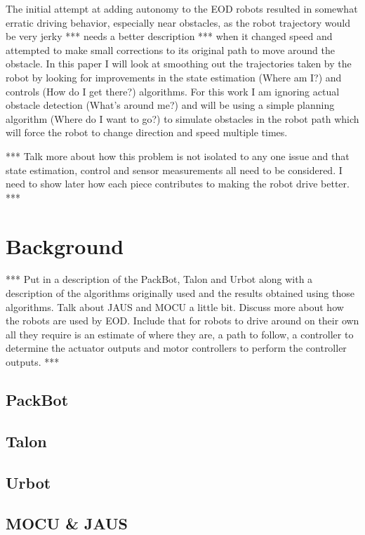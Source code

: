 \documentclass[12pt]{report}
\begin{document}
\begin{spacing}{1.1}
The initial attempt at adding autonomy to the EOD robots resulted in somewhat erratic driving behavior, especially near obstacles, as the robot trajectory would be very jerky *** needs a better description *** when it changed speed and attempted to make small corrections to its original path to move around the obstacle. In this paper I will look at smoothing out the trajectories taken by the robot by looking for improvements in the state estimation (Where am I?) and controls (How do I get there?) algorithms. For this work I am ignoring actual obstacle detection (What's around me?) and will be using a simple planning algorithm (Where do I want to go?) to simulate obstacles in the robot path which will force the robot to change direction and speed multiple times.

*** Talk more about how this problem is not isolated to any one issue and that state estimation, control and sensor measurements all need to be considered. I need to show later how each piece contributes to making the robot drive better. ***
\clearpage

\chapter{Background}
*** Put in a description of the PackBot, Talon and Urbot along with a description of the algorithms originally used and the results obtained using those algorithms. Talk about JAUS and MOCU a little bit. Discuss more about how the robots are used by EOD. Include that for robots to drive around on their own all they require is an estimate of where they are, a path to follow, a controller to determine the actuator outputs and motor controllers to perform the controller outputs. ***

\section{PackBot}

\section{Talon}

\section{Urbot}

\section{MOCU \& JAUS}


\end{spacing}
\end{document}
